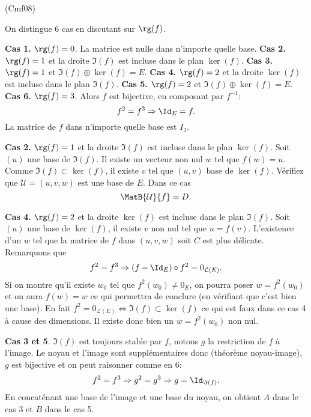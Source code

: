 \begin{tiny}(Cmf08)\end{tiny} On distingue 6 cas en discutant sur $\rg(f)$.

\textbf{Cas 1.} $\rg(f)=0$. La matrice est nulle dans n'importe quelle base.\newline
\textbf{Cas 2.} $\rg(f)=1$ et la droite $\Im(f)$ est incluse dans le plan $\ker(f)$.\newline
\textbf{Cas 3.} $\rg(f) = 1$ et $\Im(f) \oplus \ker(f) = E$. \newline
\textbf{Cas 4.} $\rg(f) = 2$ et la droite $\ker(f)$ est incluse dans le plan $\Im(f)$.\newline
\textbf{Cas 5.} $\rg(f) = 2$ et $\Im(f) \oplus \ker(f) = E$. \newline
\textbf{Cas 6.} $\rg(f) = 3$. Alors $f$ est bijective, en composant par $f^{-1}$:
\[
  f^2 = f^3 \Rightarrow \Id_E = f.
\]
La matrice de $f$ dans n'importe quelle base est $I_3$.

\textbf{Cas 2.} $\rg(f)=1$ et la droite $\Im(f)$ est incluse dans le plan $\ker(f)$.\newline
Soit $(u)$ une base de $\Im(f)$. Il existe un vecteur non nul $w$ tel que $f(w) = u$. Comme $\Im(f) \subset \ker(f)$, il existe $v$ tel que $(u,v)$ base de $\ker(f)$.
Vérifiez que $\mathcal{U} = (u,v,w)$ est une base de $E$. Dans ce cas
\[
  \MatB{\mathcal{U}}{f} = D.
\]

\textbf{Cas 4.} $\rg(f) = 2$ et la droite $\ker(f)$ est incluse dans le plan $\Im(f)$.
Soit $(u)$ une base de $\ker(f)$, il existe $v$ non nul tel que $u = f(v)$. L'existence d'un $w$ tel que la matrice de $f$ dans $(u,v,w)$ soit $C$ est plus délicate.\newline
Remarquons que 
\[
  f^2 = f^3 \Rightarrow  (f - \Id_E) \circ f^2 = 0_{\mathcal{L}(E)}.
\]
Si on montre qu'il existe $w_0$ tel que $f^2(w_0) \neq 0_E$, on pourra poser $w = f^2(w_0)$ et on aura $f(w) = w$ ce qui permettra de conclure (en vérifiant que c'est bien une base).
En fait $f^2 = 0_{\mathcal{L}(E)} \Leftrightarrow \Im(f) \subset \ker(f)$ ce qui est faux dans ce cas 4 à cause des dimensions. Il existe donc bien un $w = f^2(w_0)$ non nul.

\textbf{Cas 3 et 5}. $\Im(f)$ est toujours stable par $f$, notons $g$ la restriction de $f$ à l'image. Le noyau et l'image sont supplémentaires donc (théorème noyau-image), $g$ est bijective et on peut raisonner comme en 6:
\[
  f^2 = f^3 \Rightarrow g^2 = g^3 \Rightarrow g = \Id_{\Im(f)}.
\]
En concaténant une base de l'image et une base du noyau, on obtient $A$ dans le cas 3 et $B$ dans le cas 5. 
